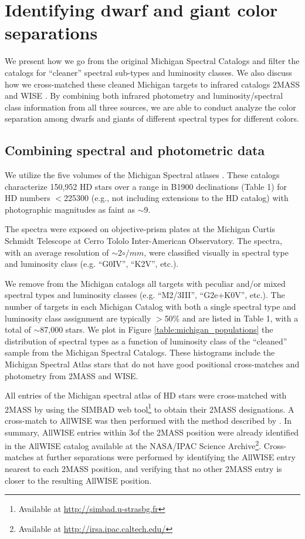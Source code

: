 \chapter{Identifying dwarf and giant color separations} \label{chap:2}

We present how we go from the original Michigan Spectral Catalogs \citep{Houk1975,Houk1978,Houk1982,Houk1988,Houk1999} and filter the catalogs for ``cleaner'' spectral sub-types and luminosity classes. We also discuss how we cross-matched these cleaned Michigan targets to infrared catalogs 2MASS and WISE \citep{2MASS,ALLWISE}. By combining both infrared photometry and luminosity/spectral class information from all three sources, we are able to conduct analyze the color separation among dwarfs and giants of different spectral types for different colors.

\section{Combining spectral and photometric data} \label{sec:cross-matching}
We utilize the five volumes of the Michigan Spectral atlases \citep[]{Houk1975, Houk1978, Houk1982,Houk1988,Houk1999}. These catalogs characterize 150,952 HD stars over a range in B1900 declinations (Table 1) for HD numbers $<$225300 (e.g., not including extensions to the HD catalog) with photographic magnitudes as faint as $\sim$9.

The spectra were exposed on objective-prism plates at the Michigan Curtis Schmidt Telescope at Cerro Tololo Inter-American Observatory. The spectra, with an average resolution of $\sim$2$\circ/mm$, were classified visually in spectral type and luminosity class (e.g. ``G0IV'', ``K2V'', etc.).  

We remove from the Michigan catalogs all targets with peculiar and/or mixed spectral types and luminosity classes (e.g. ``M2/3III'', ``G2e+K0V'', etc.).  The  number of targets in each Michigan Catalog with both a single spectral type and luminosity class assignment are typically $>$50\% and are listed in Table 1, with a total of $\sim$87,000 stars. We plot in Figure \ref{table:michigan_populations} the distribution of spectral types as a function of luminosity class of the ``cleaned'' sample from the Michigan Spectral Catalogs.  These histograms include the Michigan Spectral Atlas stars that do not have good positional cross-matches and photometry from 2MASS and WISE. 

All entries of the Michigan spectral atlas of HD stars were cross-matched with 2MASS \citep{Skrutskie2006} by using the SIMBAD web tool\footnote{Available at \url{http://simbad.u-strasbg.fr}} to obtain their 2MASS designations. A cross-match to AllWISE \cite{ALLWISE,ALLWISE-dwarfs} was then performed with the method described by \cite{BANYAN}. In summary, AllWISE entries within 3\arcsec of the 2MASS position were already identified in the AllWISE catalog available at the NASA/IPAC Science Archive\footnote{Available at \url{http://irsa.ipac.caltech.edu/}}. Cross-matches at further separations were performed by identifying the AllWISE entry nearest to each 2MASS position, and verifying that no other 2MASS entry is closer to the resulting AllWISE position.

